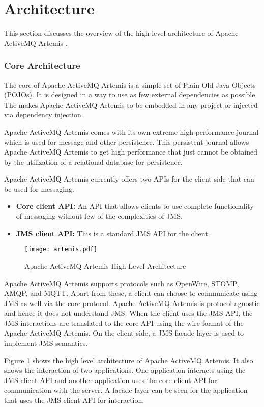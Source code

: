 \section{Architecture}

This section discusses the overview of the high-level architecture of Apache ActiveMQ Artemis \parencite{artemis_architecture}.

\subsubsection{Core Architecture}

The core of Apache ActiveMQ Artemis is a simple set of Plain Old Java Objects (POJOs). It is designed in a way to use as few external dependencies as possible. The makes Apache ActiveMQ Artemis to be embedded in any project or injected via dependency injection.

Apache ActiveMQ Artemis comes with its own extreme high-performance journal which is used for message and other persistence. This persistent journal allows Apache ActiveMQ Artemis to get high performance that just cannot be obtained by the utilization of a relational database for persistence.

Apache ActiveMQ Artemis currently offers two APIs for the client side that can be used for messaging.

\begin{itemize}
    \item \textbf{Core client API:}
          An API that allows clients to use complete functionality of messaging without few of the complexities of JMS.

    \item \textbf{JMS client API:}
          This is a standard JMS API for the client.

\end{itemize}

\makeatletter
\setlength{\intextsep}{20pt}
\makeatother

\begin{figure}[h!]
\centering
\texttt{[image: artemis.pdf]}
\caption{Apache ActiveMQ Artemis High Level Architecture}\label{figures:artemis}
\end{figure}

Apache ActiveMQ Artemis supports protocols such as OpenWire, STOMP, AMQP, and MQTT. Apart from these, a client can choose to communicate using JMS as well via the core protocol. Apache ActiveMQ Artemis is protocol agnostic and hence it does not understand JMS. When the client uses the JMS API, the JMS interactions are translated to the core API using the wire format of the Apache ActiveMQ Artemis. On the client side, a JMS facade layer is used to implement JMS semantics.

Figure \ref{figures:artemis} shows the high level architecture of Apache ActiveMQ Artemis. It also shows the interaction of two applications. One application interacts using the JMS client API and another application uses the core client API for communication with the server. A facade layer can be seen for the application that uses the JMS client API for interaction.